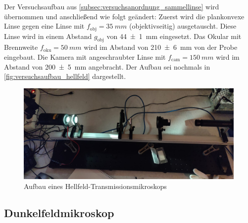 \documentclass[english, ngerman]{scrartcl}
\begin{document}
Der Versuchsaufbau aus \autoref{subsec:versuchsanordnung_sammellinse} wird übernommen und anschließend wie folgt geändert: Zuerst wird die plankonvexe Linse gegen eine Linse mit $f_\text{obj} = \SI{35}{mm}$ (objektivseitig) ausgetauscht. Diese Linse wird in einem Abstand $g_{\text{obj}}$ von \SI{44(1)}{mm} eingesetzt. Das Okular mit Brennweite $f_\text{oku} = \SI{50}{mm}$ wird im Abstand von \SI{210(6)}{mm} von der Probe eingebaut. Die Kamera mit angeschraubter Linse mit $f_\text{cam} = \SI{150}{mm}$ wird im Abstand von \SI{200(5)}{mm} angebracht. %
Der Aufbau sei nochmals in \autoref{fig:versuchsaufbau_hellfeld} dargestellt.
%
\begin{figure}
    \centering
    \begin{samepage}
        \includegraphics[width=0.85\linewidth]{fig/Hellfeld_.jpeg}
        \caption{Aufbau eines Hellfeld-Transmissionsmikroskops}
        \label{fig:versuchsaufbau_hellfeld}
    \end{samepage}
\end{figure}


\subsection{Dunkelfeldmikroskop}
\label{subsec:versuchsanordnung_dunkelfeld}
\end{document}
